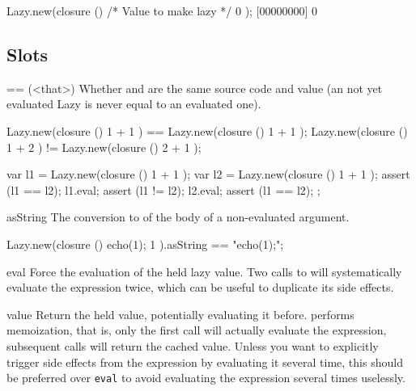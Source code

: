 \begin{urbiscript}
Lazy.new(closure () { /* Value to make lazy */ 0 });
[00000000] 0
\end{urbiscript}

\subsection{Slots}

\begin{urbiscriptapi}
\item[==](<that>)%
  Whether \this and  are the same source code and value (an not
  yet evaluated Lazy is never equal to an evaluated one).
\begin{urbiassert}
Lazy.new(closure () { 1 + 1 }) == Lazy.new(closure () { 1 + 1 });
Lazy.new(closure () { 1 + 2 }) != Lazy.new(closure () { 2 + 1 });
\end{urbiassert}
\begin{urbiscript}
{
  var l1 = Lazy.new(closure () { 1 + 1 });
  var l2 = Lazy.new(closure () { 1 + 1 });
  assert (l1 == l2);
  l1.eval;
  assert (l1 != l2);
  l2.eval;
  assert (l1 == l2);
};
\end{urbiscript}

\item[asString]
  The conversion to  of the body of a non-evaluated
  argument.
\begin{urbiassert}
Lazy.new(closure () { echo(1); 1 }).asString == "echo(1);";
\end{urbiassert}

\item[eval]%
  Force the evaluation of the held lazy value. Two calls to 
  will systematically evaluate the expression twice, which can be useful to
  duplicate its side effects.

\item[value]%
  Return the held value, potentially evaluating it before. 
  performs memoization, that is, only the first call will actually evaluate
  the expression, subsequent calls will return the cached value. Unless you
  want to explicitly trigger side effects from the expression by evaluating
  it several time, this should be preferred over \lstinline|eval| to avoid
  evaluating the expression several times uselessly.
\end{urbiscriptapi}


